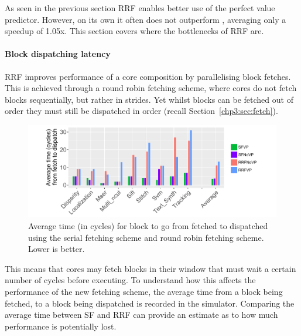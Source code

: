 As seen in the previous section RRF enables better use of the perfect value predictor. 
However, on its own it often does not outperform \novp{}, averaging only a speedup of 1.05x.
This section covers where the bottlenecks of RRF are.%

\paragraph*{Block dispatching latency}

RRF improves performance of a core composition by parallelising block fetches.
This is achieved through a round robin fetching scheme, where cores do not fetch blocks sequentially, but rather in strides.
Yet whilst blocks can be fetched out of order they must still be dispatched in order (recall Section~\ref{chp3:sec:fetch}).

\begin{figure}[t]
    \centering
    \includegraphics[width=1\textwidth]{chapter3/graphics/avTimeToFetch3.pdf}
    \caption{Average time (in cycles) for block to go from fetched to dispatched using the serial fetching scheme and round robin fetching scheme. Lower is better.}
    \label{fig:av_time}
	\vspace{1em}
\end{figure}

This means that cores may fetch blocks in their window that must wait a certain number of cycles before executing.
To understand how this affects the performance of the new fetching scheme, the average time from a block being fetched, to a block being dispatched is recorded in the simulator.
Comparing the average time between SF and RRF can provide an estimate as to how much performance is potentially lost.

